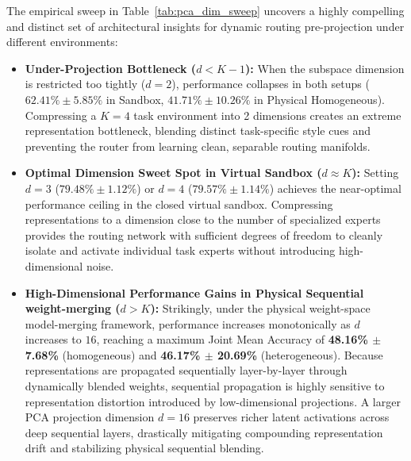 The empirical sweep in Table~\ref{tab:pca_dim_sweep} uncovers a highly compelling and distinct set of architectural insights for dynamic routing pre-projection under different environments:
\begin{itemize}
    \item \textbf{Under-Projection Bottleneck ($d < K - 1$):} When the subspace dimension is restricted too tightly ($d = 2$), performance collapses in both setups ($62.41\% \pm 5.85\%$ in Sandbox, $41.71\% \pm 10.26\%$ in Physical Homogeneous). Compressing a $K = 4$ task environment into 2 dimensions creates an extreme representation bottleneck, blending distinct task-specific style cues and preventing the router from learning clean, separable routing manifolds.
    \item \textbf{Optimal Dimension Sweet Spot in Virtual Sandbox ($d \approx K$):} Setting $d = 3$ ($79.48\% \pm 1.12\%$) or $d = 4$ ($79.57\% \pm 1.14\%$) achieves the near-optimal performance ceiling in the closed virtual sandbox. Compressing representations to a dimension close to the number of specialized experts provides the routing network with sufficient degrees of freedom to cleanly isolate and activate individual task experts without introducing high-dimensional noise.
    \item \textbf{High-Dimensional Performance Gains in Physical Sequential weight-merging ($d > K$):} Strikingly, under the physical weight-space model-merging framework, performance increases monotonically as $d$ increases to $16$, reaching a maximum Joint Mean Accuracy of \textbf{48.16\% $\pm$ 7.68\%} (homogeneous) and \textbf{46.17\% $\pm$ 20.69\%} (heterogeneous). Because representations are propagated sequentially layer-by-layer through dynamically blended weights, sequential propagation is highly sensitive to representation distortion introduced by low-dimensional projections. A larger PCA projection dimension $d=16$ preserves richer latent activations across deep sequential layers, drastically mitigating compounding representation drift and stabilizing physical sequential blending.
\end{itemize}

